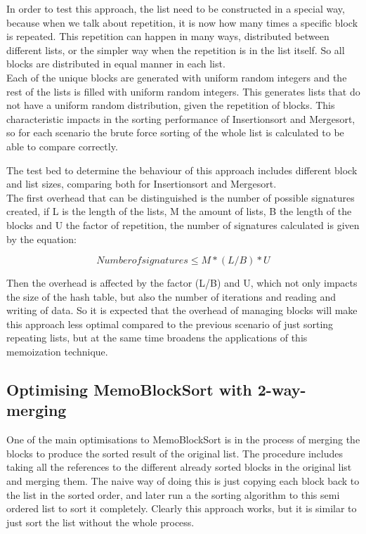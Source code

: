 \documentclass[a4paper,12pt]{article}
\begin{document}
In order to test this approach, the list need to be constructed in a special way, because when we talk about repetition, it is now how many times a specific block is repeated. This repetition can happen in many ways, distributed between different lists, or the simpler way when the repetition is in the list itself. So all blocks are distributed in equal manner in each list.\\

Each of the unique blocks are generated with uniform random integers and the rest of the lists is filled with uniform random integers. This generates lists that do not have a uniform random distribution, given the repetition of blocks. This characteristic impacts in the sorting performance of Insertionsort and Mergesort, so for each scenario the brute force sorting of the whole list is calculated to be able to compare correctly. 

The test bed to determine the behaviour of this approach includes different block and list sizes, comparing both for Insertionsort and Mergesort. \\

The first overhead that can be distinguished is the number of possible signatures created, if L is the length of the lists, M the amount of lists, B the length of the blocks and U the factor of repetition, the number of signatures calculated is given by the equation:

\begin{equation}
Number of signatures \leq  M * (L / B) * U
\end{equation}

Then the overhead is affected by the factor (L/B) and U, which not only impacts the size of the hash table, but also the number of iterations and reading and writing of data. So it is expected that the overhead of managing blocks will make this approach less optimal compared to the previous scenario of just sorting repeating lists, but at the same time broadens the applications of this memoization technique.

\subsection{Optimising MemoBlockSort with 2-way-merging}
One of the main optimisations to MemoBlockSort is in the process of merging the blocks to produce the sorted result of the original list. The procedure includes taking all the references to the different already sorted blocks in the original list and merging them. The naive way of doing this is just copying each block back to the list in the sorted order, and later run a the sorting algorithm to this semi ordered list to sort it completely. Clearly this approach works, but it is similar to just sort the list without the whole process.
\end{document}
